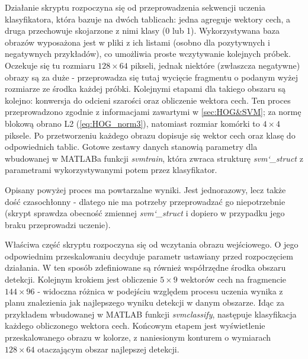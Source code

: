 Działanie skryptu rozpoczyna się od przeprowadzenia sekwencji uczenia klasyfikatora, która bazuje na dwóch tablicach: jedna agreguje wektory cech, a druga przechowuje skojarzone z nimi klasy (0 lub 1). Wykorzystywana baza obrazów wyposażona jest w pliki z ich listami (osobno dla pozytywnych i negatywnych przykładów), co umożliwia proste wczytywanie kolejnych próbek. Oczekuje się tu rozmiaru $128\times 64$ pikseli, jednak niektóre (zwłaszcza negatywne) obrazy są za duże - przeprowadza się tutaj wycięcie fragmentu o podanym wyżej rozmiarze ze środka każdej próbki. Kolejnymi etapami dla takiego obszaru są kolejno: konwersja do odcieni szarości oraz obliczenie wektora cech. Ten proces przeprowadzono zgodnie z informacjami zawartymi w \ref{sec:HOG&SVM}; za normę blokową obrano L2 (\ref{eq:HOG_norm3}), natomiast rozmiar komórki to $4\times 4$ piksele. Po przetworzeniu każdego obrazu dopisuje się wektor cech oraz klasę do odpowiednich tablic.
\newline
Gotowe zestawy danych stanowią parametry dla wbudowanej w MATLABa funkcji \textit{svmtrain}, która zwraca strukturę \textit{svm\char`_struct} z parametrami wykorzystywanymi potem przez klasyfikator.

Opisany powyżej proces ma powtarzalne wyniki. Jest jednorazowy, lecz także dość czasochłonny - dlatego nie ma potrzeby przeprowadzać go niepotrzebnie (skrypt sprawdza obecność zmiennej \textit{svm\char`_struct} i dopiero w przypadku jego braku przeprowadzi uczenie).

Właściwa część skryptu rozpoczyna się od wczytania obrazu wejściowego. O jego odpowiednim przeskalowaniu decyduje parametr ustawiany przed rozpoczęciem działania. W ten sposób zdefiniowane są również współrzędne środka obszaru detekcji. Kolejnym krokiem jest obliczenie $5\times 9$ wektorów cech na fragmencie $144 \times 96$ - widoczna różnica w podejściu względem procesu uczenia wynika z planu znalezienia jak najlepszego wyniku detekcji w danym obszarze. Idąc za przykładem wbudowanej w MATLAB funkcji \textit{svmclassify}, następuje klasyfikacja każdego obliczonego wektora cech. Końcowym etapem jest wyświetlenie przeskalowanego obrazu w kolorze, z naniesionym konturem o wymiarach $128\times 64$ otaczającym obszar najlepszej detekcji. 

